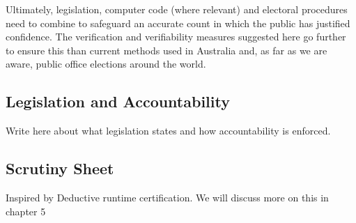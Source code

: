 Ultimately, legislation, computer code (where relevant) and
electoral procedures need to combine to safeguard an accurate count
in which the public has justified confidence. The verification and
verifiability measures suggested here go further to ensure this than
current methods used in Australia and, as far as we are aware,
public office elections around the world.

   		
		
   
	

  
    
%   
%   	
%    
%    
%		
%	  
%       
       
       
     
   \subsection{Legislation and Accountability}
    Write here about what legislation states and how accountability 
    is enforced. 
   	 
  
	       
    
   \subsection{Scrutiny Sheet}
       Inspired by Deductive runtime certification. 
    We will discuss more on this in chapter 5
   

